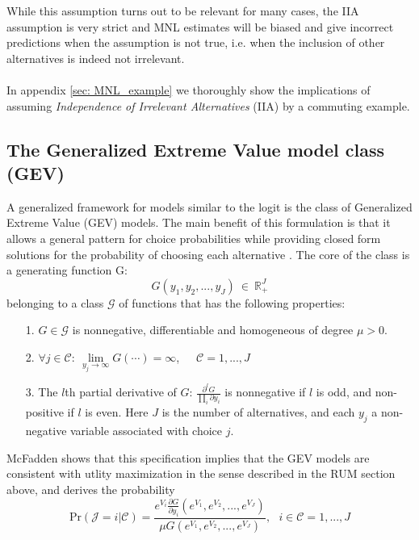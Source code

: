 While this assumption turns out to be relevant for many cases, the IIA assumption is very strict and MNL estimates will be biased and give incorrect predictions when the assumption is not true, i.e. when the inclusion of other alternatives is indeed not irrelevant.
\\ \\
In appendix \ref{sec: MNL_example} we thoroughly show the implications of assuming \textit{Independence of Irrelevant Alternatives} (IIA) by a commuting example.

\subsection{The Generalized Extreme Value model class (GEV)} \label{seq: GEV}
A generalized framework for models similar to the logit is the class of Generalized Extreme Value (GEV) models. The main benefit of this formulation is that it allows a general pattern for choice probabilities while providing closed form solutions for the probability of choosing each alternative \citep{mcfadden_modelling_1977}. The core of the class is a generating function G:
  \begin{equation} \label{eq: G-properties}
  G(y_1, y_2, ..., y_J)\ \in \ \mathbb{R}^J_{+}
  \end{equation}
belonging to a class $\mathcal{G}$ of functions that has the following properties:
\begin{itemize}
  \item[1.] $G \in \mathcal{G}$ is nonnegative, differentiable and homogeneous of degree $\mu>0$.
  \item[2.] $\forall j \in \mathcal{C}: \ \lim\limits_{y_j \rightarrow \infty} G(\cdots) = \infty$,\ \ \  $\mathcal{C}=1,...,J$
  \item[3.] The $l$th partial derivative of $G$: $\frac{\partial^l G}{\prod_i \partial y_i}$ is nonnegative if $l$ is odd, and non-positive if $l$ is even. Here $J$ is the number of alternatives, and each $y_j$ a non-negative variable associated with choice $j$.
\end{itemize}
McFadden \citeyear{mcfadden_modelling_1977} shows that this specification implies that the GEV models are consistent with utlity maximization in the sense described in the RUM section above, and derives the probability
  \begin{equation} \label{eq: simpleprob}
    \textrm{Pr}(\mathcal{J} = i| \mathcal{C}) = \frac{e^{V_i} \frac{\partial G}{\partial y_i} (e^{V_1}, e^{V_2}, ..., e^{V_J}) }{\mu G(e^{V_1}, e^{V_2}, ..., e^{V_J})},\ \ \ i\in\mathcal{C}=1,...,J
  \end{equation}
